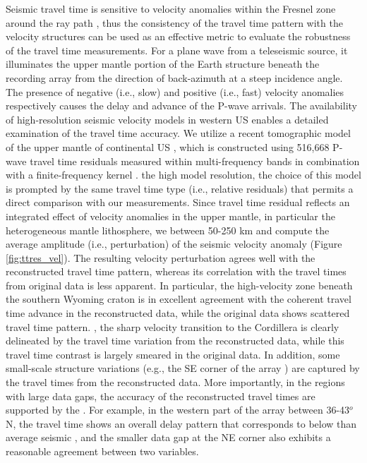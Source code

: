 Seismic travel time is sensitive to velocity anomalies within the Fresnel zone around the ray path \cite{dahlen2000frechet}, thus the consistency of the travel time pattern with the velocity structures can be used as an effective metric to evaluate the robustness of the travel time measurements. For a plane wave from a teleseismic source, it illuminates the upper mantle portion of the Earth structure beneath the recording array from the direction of back-azimuth  at a steep incidence angle. The presence of negative (i.e., slow) and positive (i.e., fast) velocity anomalies respectively causes the delay and advance of the P-wave arrivals. The availability of high-resolution seismic velocity models in  western US enables a detailed examination of the travel time accuracy. We utilize a recent  tomographic model of the upper mantle of continental US \cite{schmandt2014p}, which is constructed using 516,668 P-wave travel time residuals measured within multi-frequency bands in combination with a finite-frequency kernel \cite{dahlen2000frechet}.  the high model resolution, the choice of this model is prompted by the same travel time type (i.e., relative residuals) that permits a direct comparison with our measurements. Since travel time residual reflects an integrated effect of velocity anomalies in the upper mantle, in particular the heterogeneous mantle lithosphere, we  between 50-250 km and compute the average amplitude (i.e., perturbation) of the seismic velocity anomaly (Figure \ref{fig:ttres_vel}\color{blue}{(c)}\color{black}{}). The resulting velocity perturbation agrees well with the reconstructed travel time pattern, whereas its correlation with the travel times from original data is less apparent. In particular, the high-velocity zone beneath the southern Wyoming craton is in excellent agreement with the coherent travel time advance in the reconstructed data, while the original data shows  scattered travel time pattern. , the sharp velocity transition to the  Cordillera is clearly delineated by the travel time variation from the reconstructed data, while this travel time contrast is largely smeared in the original data. In addition, some small-scale structure variations (e.g., the SE corner of the array ) are captured by the travel times from the reconstructed data.  More importantly, in the regions with large data gaps, the accuracy of the reconstructed travel times are supported by the .  For example, in the western part of the array between 36-43$^o$  N, the travel time shows an overall delay pattern that corresponds to below than average seismic , and the smaller data gap at the NE corner also exhibits a reasonable agreement between  two variables.

